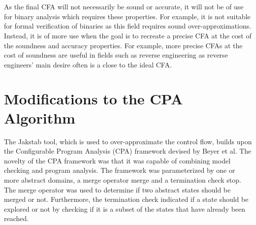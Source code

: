 \documentclass{kththesis}
\newcommand{\fbcomment}[1]{{#1}}
\renewcommand{\fbcomment}[1]{}
\begin{document}
\\ \\
As the final CFA will not necessarily be sound or accurate, it will not be of use for binary analysis which requires these properties. For example, it is not suitable for formal verification of binaries as this field requires sound over-approximations. Instead, it is of more use when the goal is to recreate a precise CFA at the cost of the soundness and accuracy properties. For example, more precise CFAs at the cost of soundness are useful in fields such as reverse engineering as reverse engineers' main desire often is a close to the ideal CFA.

\section{Modifications to the CPA Algorithm}\label{sec:modsToCPA}
\fbcomment{\color{red}Goal: Describe the origin of the CPA Algorithm and why it has morphed into the CPA+ algorithm and Jakstab algorithm. Additionally, explain how and why it was changed in this thesis.}
The Jakstab tool, which is used to over-approximate the control flow, builds upon the Configurable Program Analysis (CPA) framework devised by Beyer et al\cite{cpaAlgo}. The novelty of the CPA framework was that it was capable of combining model checking and program analysis. The framework was parameterized by one or more abstract domains, a merge operator merge and a termination check stop. The merge operator was used to determine if two abstract states should be merged or not. Furthermore, the termination check indicated if a state should be explored or not by checking if it is a subset of the states that have already been reached.
\end{document}
